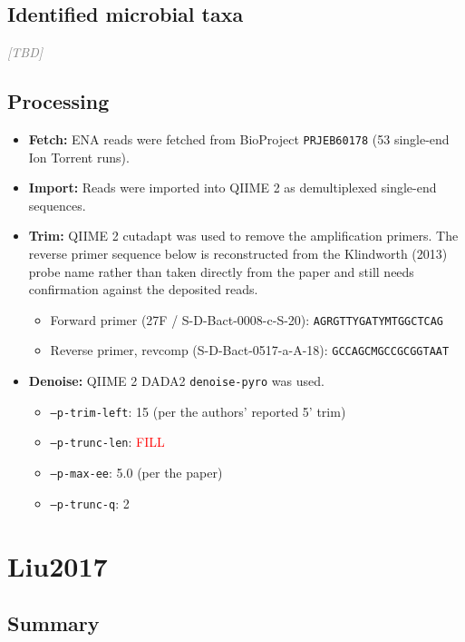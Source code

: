 \documentclass[11pt,a4paper]{article}
\newcommand{\tbd}{\textcolor{gray}{\emph{[TBD]}}}
\begin{document}
\subsection{Identified microbial taxa}
\tbd

\subsection{Processing}
\begin{itemize}
\item \textbf{Fetch:} ENA reads were fetched from BioProject \texttt{PRJEB60178} (53 single-end Ion Torrent runs).
\item \textbf{Import:} Reads were imported into QIIME 2 as demultiplexed single-end sequences.
\item \textbf{Trim:} QIIME 2 cutadapt was used to remove the amplification primers. The reverse primer sequence below is reconstructed from the Klindworth (2013) probe name rather than taken directly from the paper and still needs confirmation against the deposited reads.
  \begin{itemize}
  \item Forward primer (27F / S-D-Bact-0008-c-S-20): \texttt{AGRGTTYGATYMTGGCTCAG}
  \item Reverse primer, revcomp (S-D-Bact-0517-a-A-18): \texttt{GCCAGCMGCCGCGGTAAT}
  \end{itemize}
\item \textbf{Denoise:} QIIME 2 DADA2 \texttt{denoise-pyro} was used.
  \begin{itemize}
  \item \texttt{--p-trim-left}: 15 (per the authors' reported 5' trim)
  \item \texttt{--p-trunc-len}: \textcolor{red}{FILL}
  \item \texttt{--p-max-ee}: 5.0 (per the paper)
  \item \texttt{--p-trunc-q}: 2
  \end{itemize}
\end{itemize}


\section{Liu2017}
\subsection{Summary}
\end{document}
